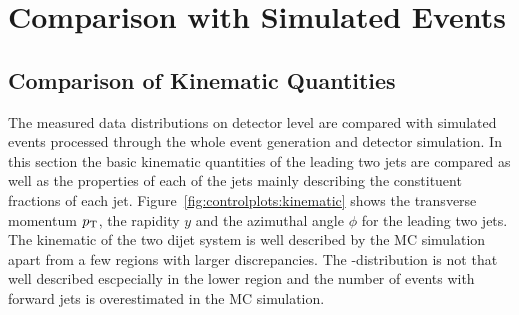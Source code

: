 \section{Comparison with Simulated Events}
\label{sec:simulated_events}

\subsection{Comparison of Kinematic Quantities}

The measured data distributions on detector level are compared with simulated events
processed through the whole event generation and detector simulation. In this section
the basic kinematic quantities of the leading two jets are compared as well as the properties
of each of the jets mainly describing the constituent fractions of each jet. Figure~\ref{fig:controlplots:kinematic}
shows the transverse momentum $p_{\mathrm{T}}$, the rapidity $y$ and the azimuthal angle $\phi$ for the leading
two jets. The kinematic of the two dijet system is well described by the MC simulation apart from
a few regions with larger discrepancies. The \pt-distribution is not that well described escpecially in
the lower \pt region and the number of events with forward jets is overestimated in the MC simulation.

